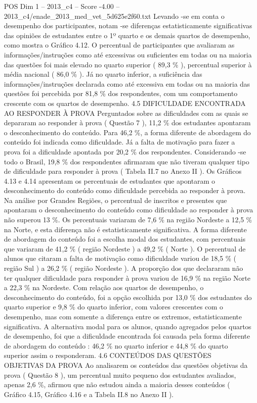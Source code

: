 \begin{textsample}{POS Dim 1 – 2013\_c4 – Score -4.00 – 2013\_c4/enade\_2013\_med\_vet\_5d625e2f60.txt}
Levando -se em conta o desempenho dos participantes, notam -se diferenças estatisticamente significativas das opiniões de estudantes entre o 1º quarto e os demais quartos de desempenho, como mostra o Gráfico 4.12.
O percentual de participantes que avaliaram as informações/instruções como até excessivas ou suficientes em todas ou na maioria das questões foi mais elevado no quarto superior ( 89,3 \% ), percentual superior à média nacional ( 86,0 \% ).
Já no quarto inferior, a suficiência das informações/instruções declarada como até excessiva em todas ou na maioria das questões foi percebida por 81,8 \% dos respondentes, com um comportamento crescente com os quartos de desempenho. 4.5 DIFICULDADE ENCONTRADA AO RESPONDER À PROVA Perguntados sobre as dificuldades com as quais se depararam ao responder à prova ( Questão 7 ), 11,2 \% dos estudantes apontaram o desconhecimento do conteúdo.
Para 46,2 \%, a forma diferente de abordagem do conteúdo foi indicada como dificuldade.
Já a falta de motivação para fazer a prova foi a dificuldade apontada por 20,2 \% dos respondentes.
Considerando -se todo o Brasil, 19,8 \% dos respondentes afirmaram que não tiveram qualquer tipo de dificuldade para responder à prova ( Tabela II.7 no Anexo II ).
Os Gráficos 4.13 e 4.14 apresentam os percentuais de estudantes que apontaram o desconhecimento do conteúdo como dificuldade percebida ao responder à prova.
Na análise por Grandes Regiões, o percentual de inscritos e presentes que apontaram o desconhecimento do conteúdo como dificuldade ao responder à prova não superou 13 \%.
Os percentuais variaram de 7,6 \% na região Nordeste a 12,5 \% na Norte, e esta diferença não é estatisticamente significativa.
A forma diferente de abordagem do conteúdo foi a escolha modal dos estudantes, com percentuais que variaram de 41,2 \% ( região Nordeste ) a 49,2 \% ( Norte ).
O percentual de alunos que citaram a falta de motivação como dificuldade variou de 18,5 \% ( região Sul ) a 26,2 \% ( região Nordeste ).
A proporção dos que declararam não ter qualquer dificuldade para responder à prova variou de 16,9 \% na região Norte a 22,3 \% na Nordeste.
Com relação aos quartos de desempenho, o desconhecimento do conteúdo, foi a opção escolhida por 13,0 \% dos estudantes do quarto superior e 9,8 \% do quarto inferior, com valores crescentes com o desempenho, mas com somente a diferença entre os extremos, estatisticamente significativa.
A alternativa modal para os alunos, quando agregados pelos quartos de desempenho, foi que a dificuldade encontrada foi causada pela forma diferente de abordagem do conteúdo : 46,2 \% no quarto inferior e 44,8 \% do quarto superior assim o responderam. 4.6 CONTEÚDOS DAS QUESTÕES OBJETIVAS DA PROVA Ao analisarem os conteúdos das questões objetivas da prova ( Questão 8 ), um percentual muito pequeno dos estudantes avaliados, apenas 2,6 \%, afirmou que não estudou ainda a maioria desses conteúdos ( Gráfico 4.15, Gráfico 4.16 e a Tabela II.8 no Anexo II ).

\end{textsample}
